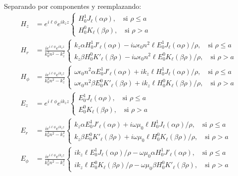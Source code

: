 Separando por componentes y reemplazando:
\begin{align*}
		H_z &=  e^{i\ell\phi}e^{i k_z z}
	  	 \left\{
		\begin{matrix}	  	 
	  	 H_0^1 J_\ell (\alpha \rho), \quad \text{si } \rho \le a  
	  	 \\
	  	 H_0^0 K_\ell (\beta \rho), \quad \text{si } \rho > a  
	  	 \end{matrix}
	  	 \right.	
		\\
	  	 H_r &= \frac{i e^{i\ell\phi}e^{i k_z z} }{k_0^2 n^2 - k_z^2}
	  	 \left\{
		\begin{matrix}	  	 
	  	  k_z \alpha H_0^1 J'_\ell (\alpha \rho) - i\omega \epsilon_0 n^2\ell E_0^1 J_\ell (\alpha \rho)/\rho, \quad \text{si } \rho \le a  
	  	 \\
	  	 k_z \beta H_0^0  K'_\ell (\beta \rho) - i\omega \epsilon_0 n^2\ell E_0^0 K_\ell (\beta \rho)/\rho  , \quad \text{si } \rho > a  
	  	 \end{matrix}
	  	 \right.
	  	 \\
		H_\phi &= \frac{ie^{i\ell\phi} e^{i k_z z}}{k_0^2 n^2 - k_z^2}
		\left\{
		\begin{matrix}
			\omega \epsilon_0 n^2  \alpha E_0^1 J'_\ell (\alpha \rho)+ik_z\ell H_0^1  J_\ell (\alpha \rho)/\rho, \quad \text{si } \rho \le a  
			\\
			\omega \epsilon_0 n^2 \beta E_0^0  K'_\ell (\beta \rho)+ik_z \ell H_0^0  K_\ell (\beta \rho)/\rho , \quad \text{si } \rho > a  
		\end{matrix}
		\right.
		\\
		E_z &= e^{i\ell\phi} e^{i k_z z}
	  	 \left\{
		\begin{matrix}	  	 
	  	 E_0^1 J_\ell (\alpha \rho), \quad \text{si } \rho \le a  
	  	 \\
	  	 E_0^0 K_\ell (\beta \rho), \quad \text{si } \rho > a  
	  	 \end{matrix}
	  	 \right.	
		\\
	E_r &= \frac{i e^{i\ell\phi} e^{i k_z z} }{k_0^2 n^2 - k_z^2}
	  	 \left\{
		\begin{matrix}	  	 
	  	  k_z \alpha E_0^1 J'_\ell (\alpha \rho)+i\omega \mu_0 \ell H_0^1 J_\ell (\alpha \rho)/\rho , \quad \text{si } \rho \le a  
	  	 \\
	  	 k_z \beta E_0^0  K'_\ell (\beta \rho) +i\omega \mu_0 \ell H_0^0 K_\ell (\beta \rho)/\rho, \quad \text{si } \rho > a  
	  	 \end{matrix}
	  	 \right.
	\\
	E_\phi &= \frac{i e^{i\ell\phi} e^{i k_z z}}{k_0^2 n^2 - k_z^2}
		\left\{
		\begin{matrix}
			ik_z \ell E_0^1   J_\ell (\alpha \rho)/\rho -\omega \mu_0  \alpha H_0^1  J'_\ell (\alpha \rho), \quad \text{si } \rho \le a  
			\\
			ik_z \ell E_0^0   K_\ell (\beta \rho)/\rho -\omega \mu_0 \beta H_0^0   K'_\ell (\beta \rho) , \quad \text{si } \rho > a  
		\end{matrix}
		\right.
\end{align*}


